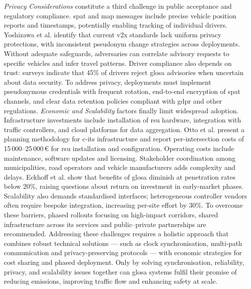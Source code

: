\textit{Privacy Considerations} constitute a third challenge in public acceptance and regulatory compliance. \ac{spat} and \ac{map} messages include precise vehicle position reports and timestamps, potentially enabling tracking of individual drivers. Yoshizawa et al. \cite{Yoshizawa2022} identify that current \ac{v2x} standards lack uniform privacy protections, with inconsistent pseudonym change strategies across deployments. Without adequate safeguards, adversaries can correlate advisory requests to specific vehicles and infer travel patterns. Driver compliance also depends on trust: surveys indicate that 45\% of drivers reject \ac{glosa} advisories when uncertain about data security. \cite{Application2011} To address privacy, deployments must implement pseudonymous credentials with frequent rotation, end-to-end encryption of \ac{spat} channels, and clear data retention policies compliant with \ac{gdpr} and other regulations.
\mynewline
\textit{Economic and Scalability} factors finally limit widespread adoption. Infrastructure investments include installation of \ac{rsu} hardware, integration with traffic controllers, and cloud platforms for data aggregation. Otto et al. \cite{Otto2023} present a planning methodology for \ac{c-its} infrastructure and report per-intersection costs of 15\,000--25\,000\,\euro{} for \ac{rsu} installation and configuration. Operating costs include maintenance, software updates and licensing. Stakeholder coordination among municipalities, road operators and vehicle manufacturers adds complexity and delays. Eckhoff et al. \cite{Eckhoff2013} show that benefits of \ac{glosa} diminish at penetration rates below 20\%, raising questions about return on investment in early-market phases. Scalability also demands standardised interfaces; heterogeneous controller vendors often require bespoke integration, increasing per-site effort by 30\%. \cite{Designing2023} To overcome these barriers, phased rollouts focusing on high-impact corridors, shared infrastructure across \ac{its} services and public–private partnerships are recommended.
\mynewline
Addressing these challenges requires a holistic approach that combines robust technical solutions --- such as clock synchronisation, multi-path communication and privacy-preserving protocols --- with economic strategies for cost sharing and phased deployment. Only by solving synchronisation, reliability, privacy, and scalability issues together can \ac{glosa} systems fulfil their promise of reducing emissions, improving traffic flow and enhancing safety at scale.


